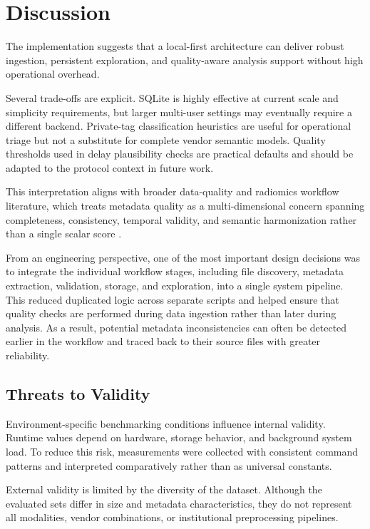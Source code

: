 \chapter{Discussion}
The implementation suggests that a local-first architecture can deliver robust ingestion, persistent exploration, and quality-aware analysis support without high operational overhead.

Several trade-offs are explicit. SQLite is highly effective at current scale and simplicity requirements, but larger multi-user settings may eventually require a different backend. Private-tag classification heuristics are useful for operational triage but not a substitute for complete vendor semantic models. Quality thresholds used in delay plausibility checks are practical defaults and should be adapted to the protocol context in future work.

This interpretation aligns with broader data-quality and radiomics workflow literature, which treats metadata quality as a multi-dimensional concern spanning completeness, consistency, temporal validity, and semantic harmonization rather than a single scalar score \cite{cancers17193213,erdal_remix}.

From an engineering perspective, one of the most important design decisions was to integrate the individual workflow stages, including file discovery, metadata extraction, validation, storage, and exploration, into a single system pipeline. This reduced duplicated logic across separate scripts and helped ensure that quality checks are performed during data ingestion rather than later during analysis. As a result, potential metadata inconsistencies can often be detected earlier in the workflow and traced back to their source files with greater reliability.

\section{Threats to Validity}
Environment-specific benchmarking conditions influence internal validity. Runtime values depend on hardware, storage behavior, and background system load. To reduce this risk, measurements were collected with consistent command patterns and interpreted comparatively rather than as universal constants.

External validity is limited by the diversity of the dataset. Although the evaluated sets differ in size and metadata characteristics, they do not represent all modalities, vendor combinations, or institutional preprocessing pipelines.

